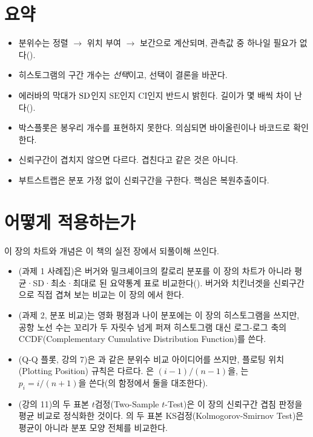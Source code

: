 \section{요약}

\begin{itemize}
  \item 분위수는 정렬 $\rightarrow$ 위치 부여 $\rightarrow$ 보간으로 계산되며,
        관측값 중 하나일 필요가 없다().
  \item 히스토그램의 구간 개수는 \emph{선택}이고, 선택이 결론을 바꾼다.
  \item 에러바의 막대가 $\mathrm{SD}$인지 $\mathrm{SE}$인지 $\mathrm{CI}$인지 반드시
        밝힌다. 길이가 몇 배씩 차이 난다().
  \item 박스플롯은 봉우리 개수를 표현하지 못한다. 의심되면 바이올린이나 바코드로
        확인한다.
  \item 신뢰구간이 겹치지 않으면 다르다. 겹친다고 같은 것은 아니다.
  \item 부트스트랩은 분포 가정 없이 신뢰구간을 구한다. 핵심은 복원추출이다.
\end{itemize}

\section{어떻게 적용하는가}
\label{sec:vis-apply}

이 장의 차트와 개념은 이 책의 실전 장에서 되풀이해 쓰인다.

\begin{itemize}
  \item {}(과제 1 사례집)은 버거와 밀크셰이크의 칼로리
        분포를 이 장의 차트가 아니라 평균·SD·최소·최대로 된 요약통계 표로
        비교한다(). 버거와 치킨너겟을 신뢰구간으로
        직접 겹쳐 보는 비교는 이 장의 에서 한다.
  \item {}(과제 2, 분포 비교)는 영화 평점과 나이 분포에는 이 장의
        히스토그램을 쓰지만, 공항 노선 수는 꼬리가 두 자릿수 넘게 퍼져
        히스토그램 대신 로그-로그 축의 CCDF(Complementary Cumulative
        Distribution Function)를 쓴다.
  \item {}(Q-Q 플롯, 강의 7)은 과 같은 분위수
        비교 아이디어를 쓰지만, 플로팅 위치(Plotting Position) 규칙은 다르다.
        은 $(i-1)/(n-1)$을, 는 $p_i = i/(n+1)$을
        쓴다(의 함정에서 둘을 대조한다).
  \item {}(강의 11)의 두 표본 $t$검정(Two-Sample $t$-Test)은
        이 장의 신뢰구간 겹침 판정을 평균 비교로 정식화한 것이다.
        의 두 표본 KS검정(Kolmogorov-Smirnov Test)은
        평균이 아니라 분포 모양 전체를 비교한다.
\end{itemize}

